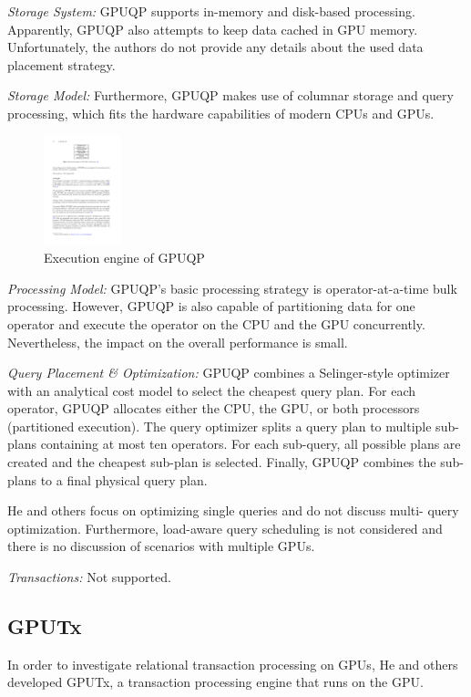 \documentclass[twocolumn]{article}
\begin{document}
\noindent
\textit{Storage System:} 
GPUQP supports in-memory and disk-based processing. 
Apparently, GPUQP also attempts to keep data cached in GPU memory. 
Unfortunately, the authors do not provide any details about the used data placement strategy.

\noindent
\textit{Storage Model:} 
Furthermore, GPUQP makes use of columnar storage and query processing, which fits the hardware capabilities of modern CPUs and GPUs.
\begin{figure}[htb]
        \centering
        \includegraphics[width=0.2\textwidth]{gpuqp.pdf}
        \caption{Execution engine of GPUQP}
        \label{fig:gpudb}
\end{figure}

\noindent
\textit{Processing Model:} 
GPUQP's basic processing strategy is operator-at-a-time bulk processing. 
However, GPUQP is also capable of partitioning data for one operator and execute the operator on the CPU and the GPU concurrently. 
Nevertheless, the impact on the overall performance is small.

\noindent
\textit{Query Placement \& Optimization:} 
GPUQP combines a Selinger-style optimizer with an analytical cost model to select the cheapest query plan. For each operator, GPUQP allocates either the CPU, the GPU, or both processors (partitioned execution). The query optimizer splits a query plan to multiple sub-plans containing at most ten operators. For each sub-query, all possible plans are created and the cheapest sub-plan is selected. Finally, GPUQP combines the sub-plans to a final physical query plan.

He and others focus on optimizing single queries and do not discuss multi- query optimization. Furthermore, load-aware query scheduling is not considered and there is no discussion of scenarios with multiple GPUs.

\noindent
\textit{Transactions:} Not supported.

\subsection{GPUTx}
In order to investigate relational transaction processing on GPUs, He and others developed GPUTx, a transaction processing engine that runs on the GPU.
\end{document}
